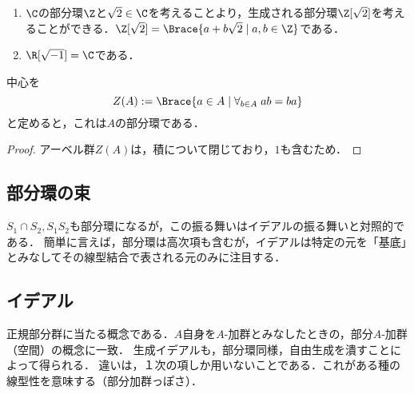 \documentclass[uplatex,dvipdfmx]{jsreport}
\begin{document}
\begin{example}\mbox{}
    \begin{enumerate}
        \item $\C$の部分環$\Z$と$\sqrt{2}\in\C$を考えることより，生成される部分環$\Z[\sqrt{2}]$を考えることができる．$\Z[\sqrt{2}]=\Brace{a+b\sqrt{2}\mid a,b\in\Z}$である．
        \item $\R[\sqrt{-1}]=\C$である．
    \end{enumerate}
\end{example}

\begin{lemma}
    中心を
    \[Z(A):=\Brace{a\in A\mid \forall_{b\in A}\;ab=ba}\]
    と定めると，これは$A$の部分環である．
\end{lemma}
\begin{proof}
    アーベル群$Z(A)$は，積について閉じており，$1$も含むため．
\end{proof}

\subsection{部分環の束}

\begin{tcolorbox}[colframe=ForestGreen, colback=ForestGreen!10!white,breakable,colbacktitle=ForestGreen!40!white,coltitle=black,fonttitle=\bfseries\sffamily,
title=]
    $S_1\cap S_2,S_1S_2$も部分環になるが，この振る舞いはイデアルの振る舞いと対照的である．
    簡単に言えば，部分環は高次項も含むが，イデアルは特定の元を「基底」とみなしてその線型結合で表される元のみに注目する．
\end{tcolorbox}

\subsection{イデアル}

\begin{tcolorbox}[colframe=ForestGreen, colback=ForestGreen!10!white,breakable,colbacktitle=ForestGreen!40!white,coltitle=black,fonttitle=\bfseries\sffamily,
title=イデアル＝部分加群]
    正規部分群に当たる概念である．$A$自身を$A$-加群とみなしたときの，部分$A$-加群（空間）の概念に一致．
    生成イデアルも，部分環同様，自由生成を潰すことによって得られる．
    違いは，１次の項しか用いないことである．これがある種の線型性を意味する（部分加群っぽさ）．
\end{tcolorbox}
\end{document}
